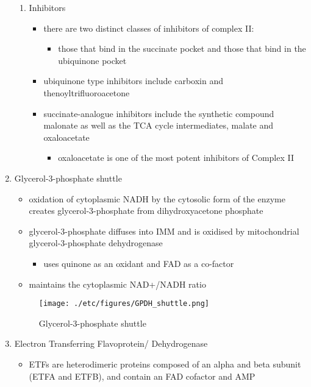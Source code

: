 \documentclass{scrartcl}
\begin{document}
\begin{enumerate}
\begin{enumerate}
\item Inhibitors
\label{sec:orga417063}
\begin{itemize}
\item there are two distinct classes of inhibitors of complex II:
\begin{itemize}
\item those that bind in the succinate pocket and those that bind in the ubiquinone pocket
\end{itemize}
\item ubiquinone type inhibitors include carboxin and thenoyltrifluoroacetone
\item succinate-analogue inhibitors include the synthetic compound malonate as well as the TCA cycle intermediates, malate and oxaloacetate
\begin{itemize}
\item oxaloacetate is one of the most potent inhibitors of Complex II
\end{itemize}
\end{itemize}
\end{enumerate}

\item Glycerol-3-phosphate shuttle
\label{sec:orgf21324d}
\begin{itemize}
\item oxidation of cytoplasmic NADH by the cytosolic form of the enzyme
creates glycerol-3-phosphate from dihydroxyacetone phosphate
\item glycerol-3-phosphate diffuses into IMM and is oxidised by mitochondrial glycerol-3-phosphate dehydrogenase
\begin{itemize}
\item uses quinone as an oxidant and FAD as a co-factor
\end{itemize}
\item maintains the cytoplasmic NAD+/NADH ratio
\end{itemize}

\begin{figure}[htbp]
\centering
\texttt{[image: ./etc/figures/GPDH\_shuttle.png]}
\caption[g3ps]{\label{fig:org3b80e37}
Glycerol-3-phosphate shuttle}
\end{figure}

\item Electron Transferring Flavoprotein/ Dehydrogenase
\label{sec:orgf9cf736}
\begin{itemize}
\item ETFs are heterodimeric proteins composed of an alpha and beta
subunit (ETFA and ETFB), and contain an FAD cofactor and AMP


\end{itemize}
\end{enumerate}
\end{document}
